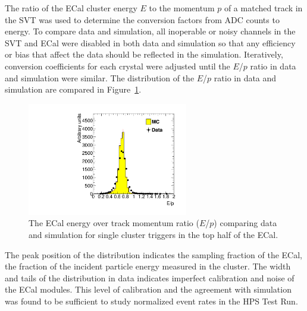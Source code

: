 \documentclass[final,3p,times,twocolumn]{elsarticle}
\begin{document}
The ratio of the ECal cluster energy $E$ to the momentum $p$ of a matched track in the SVT was used 
to determine the conversion factors from ADC counts to energy. To compare data and simulation, all 
inoperable or noisy channels in the SVT and ECal were disabled in both data and simulation so that 
any efficiency or bias that affect the data should be reflected in the simulation. 
Iteratively, conversion coefficients for each crystal were adjusted until the $E$/$p$ ratio in data and 
simulation were similar. The distribution of the $E$/$p$ ratio in data and simulation are compared in 
Figure~\ref{fig:gains}. 
{\small
\begin{figure}[]
\begin{center}
	\includegraphics[width=7cm]{figures/h_ep_data_0_h_ep_MC_0_dataMC_1351-v6-v6gains_2-trig-top-cl600reg0.pdf}
	\caption{The ECal energy over track momentum ratio ($E$/$p$) comparing data and simulation 
	for single cluster triggers in the top half of the ECal.} 
	\label{fig:gains}
\end{center}
\end{figure}
}
The peak position of the distribution indicates the sampling fraction of the ECal, the fraction of the 
incident particle energy measured in the cluster. The width and tails of the distribution 
in data indicates imperfect calibration and noise of the ECal modules. This level of calibration and the 
agreement with simulation was found to be sufficient to study normalized event rates in the 
HPS Test Run.
\end{document}
